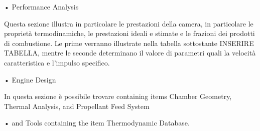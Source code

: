 • Performance Analysis

Questa sezione illustra in particolare le prestazioni della camera, in particolare le proprietà termodinamiche, le prestazioni ideali e stimate e le frazioni dei prodotti di combustione. Le prime verranno illustrate nella tabella sottostante INSERIRE TABELLA, mentre le seconde determinano il valore di parametri quali la velocità caratteristica e l'impulso specifico. 

• Engine Design

In questa sezione è possibile trovare 
 containing items Chamber Geometry, Thermal Analysis, and Propellant
Feed System 

• and Tools containing the item Thermodynamic Database. 

